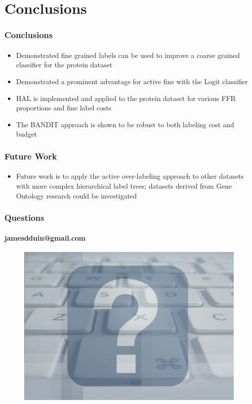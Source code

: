 \documentclass{beamer}
\begin{document}
\section{Conclusions}
\begin{frame}
    \frametitle{Conclusions}
    \framesubtitle{}
    \begin{itemize}
    \item Demonstrated fine grained labels can be used to improve a coarse grained classifier for the protein dataset
    \item Demonstrated a prominent advantage for active fine with the Logit classifier
    \item HAL is implemented and applied to the protein dataset for various FFR proportions and fine label costs
    \item The BANDIT approach is shown to be robust to both labeling cost and budget
    \end{itemize}
\end{frame}
\begin{frame}
    \frametitle{Future Work}
    \framesubtitle{}
    \begin{itemize}
      \item Future work is to apply the active over-labeling approach
      to other datasets with more complex hierarchical label trees;
      datasets derived from Gene Ontology research could be investigated
    \end{itemize}
\end{frame}


\begin{frame}
    \frametitle{Questions}
    \framesubtitle{jamesdduin@gmail.com}
    \begin{figure}[!htb]
        \centering
        \includegraphics[width=1.0\columnwidth]{fig/question}
        \label{fig:question}
    \end{figure}
\end{frame}
\end{document}

